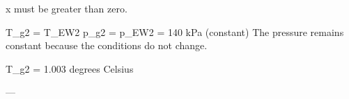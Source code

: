 x must be greater than zero.  

T_g2 = T_EW2  
p_g2 = p_EW2 = 140 kPa (constant)  
The pressure remains constant because the conditions do not change.  

T_g2 = 1.003 degrees Celsius  

---